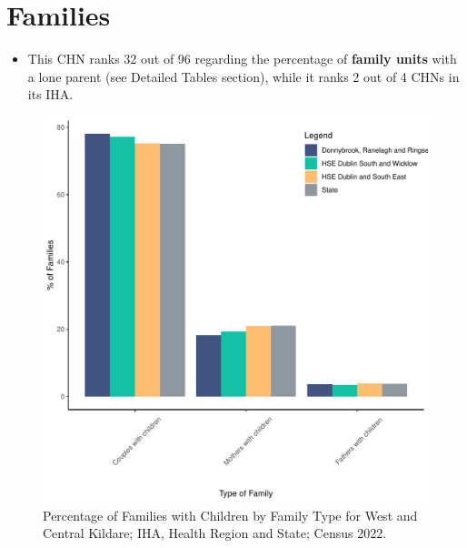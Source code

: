 \documentclass{article}
\begin{document}
\section{Families}\label{sect:Fam}
\begin{itemize}
\item This CHN ranks  32 out of 96 regarding the percentage of \textbf{family units} with a lone parent (see Detailed Tables section), while it ranks   2 out of 4 CHNs in its IHA.
\end{itemize}
\begin{figure}[H]
	\centering
	\includegraphics[width = 150mm]{../figures/FamED.pdf}
	\caption{Percentage of Families with Children by Family Type for West and Central Kildare; IHA, Health Region and State; Census 2022.}
	\label{fig:vbnv}
	\end{figure}
	
\end{document}
